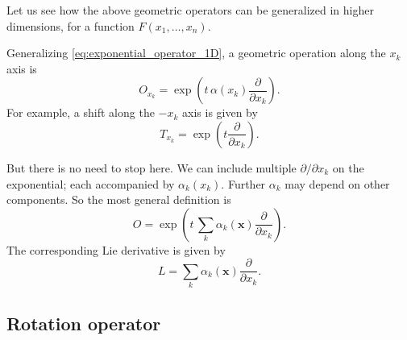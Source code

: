 \documentclass{article}
\begin{document}
Let us see how the above geometric operators can be generalized
in higher dimensions, for a function $F(x_1, \dots, x_n)$.

Generalizing \eqref{eq:exponential_operator_1D},
a geometric operation along the $x_k$ axis is
$$
O_{x_k} = \exp\left(t \, \alpha(x_k)  \frac{ \partial } { \partial x_k }\right).
$$
For example, a shift along the $-x_k$ axis is given by
$$
T_{x_k} = \exp\left( t \frac{ \partial } { \partial x_k } \right).
$$


But there is no need to stop here.
We can include multiple $\partial/\partial x_k$
on the exponential; each accompanied by
$\alpha_k(x_k)$.
Further $\alpha_k$ may depend on other components.
So the most general definition is
\begin{equation}
  O = \exp\left(t \, \sum_k \alpha_k(\mathbf x) \frac{ \partial }{ \partial x_k }  \right).
  \label{eq:exponential_operator}
\end{equation}
The corresponding Lie derivative is given by
\begin{equation}
  L = \sum_k \alpha_k(\mathbf x) \frac{ \partial }{ \partial x_k }.
  \label{eq:lieder}
\end{equation}



\subsection{Rotation operator}
\end{document}
